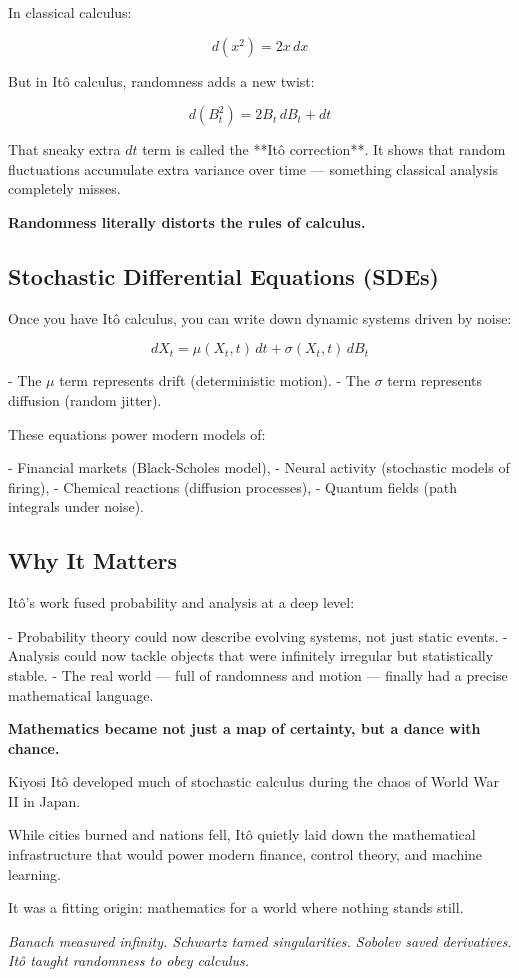 In classical calculus:

\[
d(x^2) = 2x \, dx
\]

But in Itô calculus, randomness adds a new twist:

\[
d(B_t^2) = 2B_t \, dB_t + dt
\]

That sneaky extra \( dt \) term is called the **Itô correction**.  
It shows that random fluctuations accumulate extra variance over time — something classical analysis completely misses.

\textbf{Randomness literally distorts the rules of calculus.}

\subsection*{Stochastic Differential Equations (SDEs)}

Once you have Itô calculus, you can write down dynamic systems driven by noise:

\[
dX_t = \mu(X_t, t)\,dt + \sigma(X_t, t)\,dB_t
\]

- The \( \mu \) term represents drift (deterministic motion).
- The \( \sigma \) term represents diffusion (random jitter).

These equations power modern models of:

- Financial markets (Black-Scholes model),
- Neural activity (stochastic models of firing),
- Chemical reactions (diffusion processes),
- Quantum fields (path integrals under noise).

\subsection*{Why It Matters}

Itô's work fused probability and analysis at a deep level:

- Probability theory could now describe evolving systems, not just static events.
- Analysis could now tackle objects that were infinitely irregular but statistically stable.
- The real world — full of randomness and motion — finally had a precise mathematical language.

\smallskip

\textbf{Mathematics became not just a map of certainty, but a dance with chance.}

\begin{tcolorbox}[title=Historical Sidebar: Mathematics Under Occupation, colback=gray!5!white, colframe=black!80!white, fonttitle=\bfseries]

  Kiyosi Itô developed much of stochastic calculus during the chaos of World War II in Japan.

  While cities burned and nations fell, Itô quietly laid down the mathematical infrastructure that would power modern finance, control theory, and machine learning.

  It was a fitting origin: mathematics for a world where nothing stands still.

\end{tcolorbox}

\vspace{1em}

\begin{center}
\textit{Banach measured infinity.  
Schwartz tamed singularities.  
Sobolev saved derivatives.  
Itô taught randomness to obey calculus.}
\end{center}
